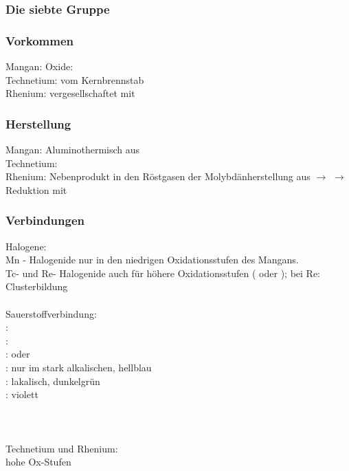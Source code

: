 \documentclass{article}
\begin{document}
\subsubsection{Die siebte Gruppe}
\subsubsection{Vorkommen}
Mangan: Oxide: \\
Technetium: vom Kernbrennstab\\
Rhenium: vergesellschaftet mit 
\subsubsection{Herstellung}
Mangan: Aluminothermisch aus \\
Technetium: \\
Rhenium: Nebenprodukt in den Röstgasen der Molybdänherstellung aus  $\rightarrow$  $\rightarrow$ Reduktion mit 

\subsubsection{Verbindungen}
Halogene:\\
Mn - Halogenide nur in den niedrigen Oxidationsstufen des Mangans.\\
Tc- und Re- Halogenide auch für höhere Oxidationsstufen ( oder ); bei Re: Clusterbildung\\\\
Sauerstoffverbindung:\\
: \\
: \\
:  oder \\
:  nur im stark alkalischen, hellblau\\
:  lakalisch, dunkelgrün\\
:  violett\\
\vspace*{2cm} \\
\vspace*{3cm} \\\\
Technetium und Rhenium:\\
hohe Ox-Stufen \\
\end{document}
